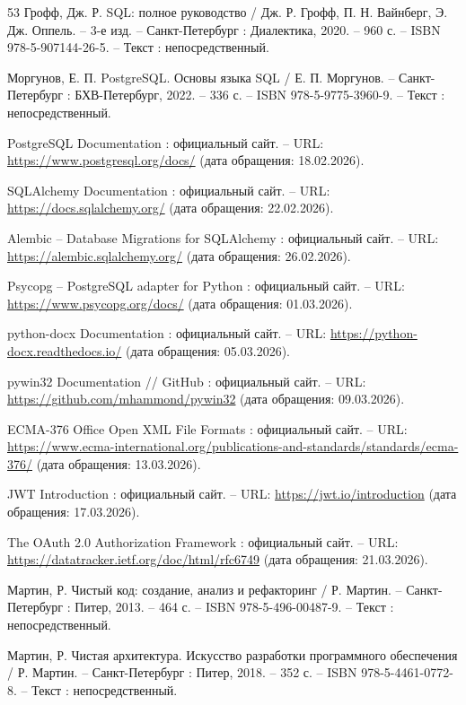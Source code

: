 \begin{thebibliography}{53}
	Грофф, Дж. Р. SQL: полное руководство / Дж. Р. Грофф, П. Н. Вайнберг, Э. Дж. Оппель. – 3-е изд. – Санкт-Петербург : Диалектика, 2020. – 960 с. – ISBN 978-5-907144-26-5. – Текст : непосредственный.
	
	Моргунов, Е. П. PostgreSQL. Основы языка SQL / Е. П. Моргунов. – Санкт-Петербург : БХВ-Петербург, 2022. – 336 с. – ISBN 978-5-9775-3960-9. – Текст : непосредственный.
	
	PostgreSQL Documentation : официальный сайт. – URL: \url{https://www.postgresql.org/docs/} (дата обращения: 18.02.2026).
	
	SQLAlchemy Documentation : официальный сайт. – URL: \url{https://docs.sqlalchemy.org/} (дата обращения: 22.02.2026).
	
	Alembic – Database Migrations for SQLAlchemy : официальный сайт. – URL: \url{https://alembic.sqlalchemy.org/} (дата обращения: 26.02.2026).
	
	Psycopg – PostgreSQL adapter for Python : официальный сайт. – URL: \url{https://www.psycopg.org/docs/} (дата обращения: 01.03.2026).
	
	python-docx Documentation : официальный сайт. – URL: \url{https://python-docx.readthedocs.io/} (дата обращения: 05.03.2026).
	
	pywin32 Documentation // GitHub : официальный сайт. – URL: \url{https://github.com/mhammond/pywin32} (дата обращения: 09.03.2026).
	
	ECMA-376 Office Open XML File Formats : официальный сайт. – URL: \url{https://www.ecma-international.org/publications-and-standards/standards/ecma-376/} (дата обращения: 13.03.2026).
	
	JWT Introduction : официальный сайт. – URL: \url{https://jwt.io/introduction} (дата обращения: 17.03.2026).
	
	The OAuth 2.0 Authorization Framework : официальный сайт. – URL: \url{https://datatracker.ietf.org/doc/html/rfc6749} (дата обращения: 21.03.2026).
	
	Мартин, Р. Чистый код: создание, анализ и рефакторинг / Р. Мартин. – Санкт-Петербург : Питер, 2013. – 464 с. – ISBN 978-5-496-00487-9. – Текст : непосредственный.
	
	Мартин, Р. Чистая архитектура. Искусство разработки программного обеспечения / Р. Мартин. – Санкт-Петербург : Питер, 2018. – 352 с. – ISBN 978-5-4461-0772-8. – Текст : непосредственный.
	

\end{thebibliography}
